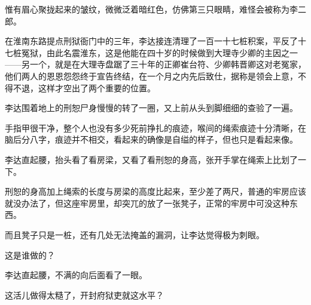 惟有眉心聚拢起来的皱纹，微微泛着暗红色，仿佛第三只眼睛，难怪会被称为李二郎。

在淮南东路提点刑狱衙门中的三年，李达接连清理了一百一十七桩积案，平反了十七桩冤狱，由此名震淮东，这是他能在四十岁的时候做到大理寺少卿的主因之一——另一个，就是在大理寺盘踞了三十年的正卿崔台符、少卿韩晋卿这对老冤家，他们两人的恩恩怨怨终于宣告终结，在一个月之内先后致仕，据称是领会上意，不得不退，这样才空出了两个重要的位置。

李达围着地上的刑恕尸身慢慢的转了一圈，又上前从头到脚细细的查验了一遍。

手指甲很干净，整个人也没有多少死前挣扎的痕迹，喉间的绳索痕迹十分清晰，在脑后分八字，痕迹并不相交，看起来的确像是自缢的样子，但也只是看起来像。

李达直起腰，抬头看了看房梁，又看了看刑恕的身高，张开手掌在绳索上比划了一下。

刑恕的身高加上绳索的长度与房梁的高度比起来，至少差了两尺，普通的牢房应该就没办法了，但这座牢房里，却突兀的放了一张凳子，正常的牢房中可没这种东西。

而且凳子只是一桩，还有几处无法掩盖的漏洞，让李达觉得极为刺眼。

这是谁做的？

李达直起腰，不满的向后面看了一眼。

这活儿做得太糙了，开封府狱吏就这水平？
